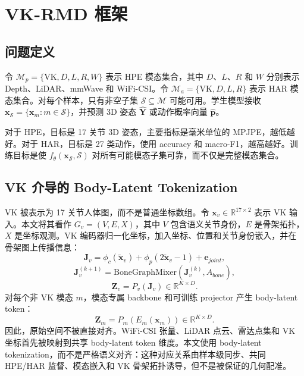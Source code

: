﻿\documentclass[UTF8,twocolumn]{ctexart}
\newcommand{\method}{VK-RMD}
\newcommand{\mpjpe}{MPJPE}
\begin{document}
\section{\method{} 框架}
\subsection{问题定义}
令 $\mathcal{M}_{p}=\{\mathrm{VK},D,L,R,W\}$ 表示 HPE 模态集合，其中 $D$、$L$、$R$ 和 $W$ 分别表示 Depth、LiDAR、mmWave 和 WiFi-CSI。令 $\mathcal{M}_{a}=\{\mathrm{VK},D,L,R\}$ 表示 HAR 模态集合。对每个样本，只有非空子集 $\mathcal{S}\subseteq \mathcal{M}$ 可能可用。学生模型接收 $\mathbf{x}_{\mathcal{S}}=\{\mathbf{x}_{m}:m\in\mathcal{S}\}$，并预测 3D 姿态 $\hat{\mathbf{Y}}$ 或动作概率向量 $\hat{\mathbf{p}}$。

对于 HPE，目标是 17 关节 3D 姿态，主要指标是毫米单位的 \mpjpe{}，越低越好。对于 HAR，目标是 27 类动作，使用 accuracy 和 macro-F1，越高越好。训练目标是使 $f_{\theta}(\mathbf{x}_{\mathcal{S}},\mathcal{S})$ 对所有可能模态子集可靠，而不仅是完整模态集合。

\subsection{VK 介导的 Body-Latent Tokenization}
VK 被表示为 17 关节人体图，而不是普通坐标数组。令 $\mathbf{x}_{v}\in\mathbb{R}^{17\times 2}$ 表示 VK 输入。本文将其看作 $G_v=(V,E,X)$，其中 $V$ 包含语义关节身份，$E$ 是骨架拓扑，$X$ 是坐标观测。VK 编码器归一化坐标，加入坐标、位置和关节身份嵌入，并在骨架图上传播信息：
\begin{equation}
    \mathbf{J}_{v}=\phi_c(\tilde{\mathbf{x}}_v)+\phi_p(2\tilde{\mathbf{x}}_v-1)+\mathbf{e}_{joint},
\end{equation}
\begin{equation}
    \mathbf{J}_{v}^{(k+1)}=\mathrm{BoneGraphMixer}(\mathbf{J}_{v}^{(k)}, A_{bone}),
\end{equation}
\begin{equation}
    \mathbf{Z}_{v}=P_v(\mathbf{J}_v)\in\mathbb{R}^{K\times D}.
\end{equation}
对每个非 VK 模态 $m$，模态专属 backbone 和可训练 projector 产生 body-latent token：
\begin{equation}
    \mathbf{Z}_{m}=P_m(E_m(\mathbf{x}_m))\in\mathbb{R}^{K\times D}.
\end{equation}
因此，原始空间不被直接对齐。WiFi-CSI 张量、LiDAR 点云、雷达点集和 VK 坐标首先被映射到共享 body-latent token 维度。本文使用 body-latent tokenization，而不是严格语义对齐：这种对应关系由样本级同步、共同 HPE/HAR 监督、模态嵌入和 VK 骨架拓扑诱导，但不是被保证的几何配准。
\end{document}
